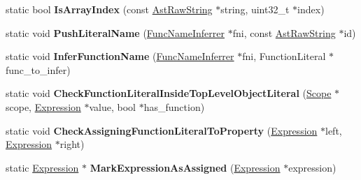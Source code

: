 \begin{DoxyCompactItemize}
\item 
\hypertarget{classv8_1_1internal_1_1_parser_traits_a79af7977af749454229e6e0d6054f1b8}{}static bool {\bfseries Is\+Array\+Index} (const \hyperlink{classv8_1_1internal_1_1_ast_raw_string}{Ast\+Raw\+String} $\ast$string, uint32\+\_\+t $\ast$index)\label{classv8_1_1internal_1_1_parser_traits_a79af7977af749454229e6e0d6054f1b8}

\item 
\hypertarget{classv8_1_1internal_1_1_parser_traits_a3124d51842dcc66220a4cf3db0e254da}{}static void {\bfseries Push\+Literal\+Name} (\hyperlink{classv8_1_1internal_1_1_func_name_inferrer}{Func\+Name\+Inferrer} $\ast$fni, const \hyperlink{classv8_1_1internal_1_1_ast_raw_string}{Ast\+Raw\+String} $\ast$id)\label{classv8_1_1internal_1_1_parser_traits_a3124d51842dcc66220a4cf3db0e254da}

\item 
\hypertarget{classv8_1_1internal_1_1_parser_traits_a1616044bda1b861847c29c9d7b8ecec7}{}static void {\bfseries Infer\+Function\+Name} (\hyperlink{classv8_1_1internal_1_1_func_name_inferrer}{Func\+Name\+Inferrer} $\ast$fni, Function\+Literal $\ast$func\+\_\+to\+\_\+infer)\label{classv8_1_1internal_1_1_parser_traits_a1616044bda1b861847c29c9d7b8ecec7}

\item 
\hypertarget{classv8_1_1internal_1_1_parser_traits_a6936ea9c98c80771760f5aa28e66df7c}{}static void {\bfseries Check\+Function\+Literal\+Inside\+Top\+Level\+Object\+Literal} (\hyperlink{classv8_1_1internal_1_1_scope}{Scope} $\ast$scope, \hyperlink{classv8_1_1internal_1_1_expression}{Expression} $\ast$value, bool $\ast$has\+\_\+function)\label{classv8_1_1internal_1_1_parser_traits_a6936ea9c98c80771760f5aa28e66df7c}

\item 
\hypertarget{classv8_1_1internal_1_1_parser_traits_a21739d8514cf648e427ff8c74df26375}{}static void {\bfseries Check\+Assigning\+Function\+Literal\+To\+Property} (\hyperlink{classv8_1_1internal_1_1_expression}{Expression} $\ast$left, \hyperlink{classv8_1_1internal_1_1_expression}{Expression} $\ast$right)\label{classv8_1_1internal_1_1_parser_traits_a21739d8514cf648e427ff8c74df26375}

\item 
\hypertarget{classv8_1_1internal_1_1_parser_traits_a99204d59464539b7468e8401aaf80bc5}{}static \hyperlink{classv8_1_1internal_1_1_expression}{Expression} $\ast$ {\bfseries Mark\+Expression\+As\+Assigned} (\hyperlink{classv8_1_1internal_1_1_expression}{Expression} $\ast$expression)\label{classv8_1_1internal_1_1_parser_traits_a99204d59464539b7468e8401aaf80bc5}


\end{DoxyCompactItemize}
